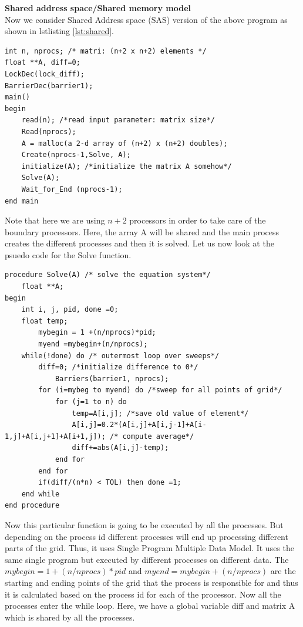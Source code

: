 \documentclass[12pt]{book}
\begin{document}
\textbf{Shared address space/Shared memory model}\\
Now we consider Shared Address space (SAS) version of the above program as shown in lstlisting \ref{lst:shared}.
\begin{lstlisting}[caption={Shared Address Space Version},captionpos=b,label={lst:shared}]
int n, nprocs; /* matri: (n+2 x n+2) elements */
float **A, diff=0;
LockDec(lock_diff);
BarrierDec(barrier1);
main()
begin
    read(n); /*read input parameter: matrix size*/
    Read(nprocs);
    A = malloc(a 2-d array of (n+2) x (n+2) doubles);
    Create(nprocs-1,Solve, A);
    initialize(A); /*initialize the matrix A somehow*/
    Solve(A);
    Wait_for_End (nprocs-1);
end main
\end{lstlisting}
Note that here we are using $n+2$ processors in order to take care of the boundary processors.
Here, the array A will be shared and the main process creates the different processes and then it is solved.
Let us now look at the psuedo code for the Solve function.
\begin{lstlisting}[caption={Solve Function},captionpos=b,label={lst:solve}]
procedure Solve(A) /* solve the equation system*/
    float **A;
begin
    int i, j, pid, done =0;
    float temp;
        mybegin = 1 +(n/nprocs)*pid;
        myend =mybegin+(n/nprocs);
    while(!done) do /* outermost loop over sweeps*/
        diff=0; /*initialize difference to 0*/
            Barriers(barrier1, nprocs);
        for (i=mybeg to myend) do /*sweep for all points of grid*/
            for (j=1 to n) do
                temp=A[i,j]; /*save old value of element*/
                A[i,j]=0.2*(A[i,j]+A[i,j-1]+A[i-1,j]+A[i,j+1]+A[i+1,j]); /* compute average*/
                diff+=abs(A[i,j]-temp);
            end for
        end for
        if(diff/(n*n) < TOL) then done =1;
    end while
end procedure
\end{lstlisting}
Now this particular function is going to be executed by all the processes. But depending on the 
process id different processes will end up processing different parts of the grid. Thus, it uses Single Program Multiple Data Model.
It uses the same single program but executed by different processes on different data.
The $mybegin=1+(n/nprocs)*pid$ and $myend=mybegin+(n/nprocs)$ are the starting and ending points of the grid that the process is responsible for and thus it is calculated based on the process id for each of the processor.
Now all the processes enter the while loop. Here, we have a global variable diff and matrix A which is shared by all the processes.
\end{document}
